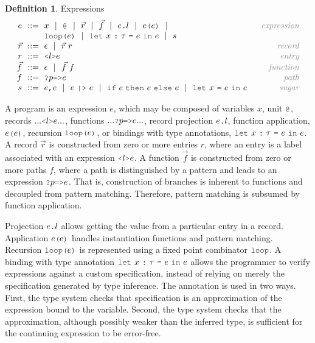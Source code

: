 \documentclass[acmsmall]{acmart}
\theoremstyle{definition}
\newtheorem{definition}{Definition}[section]
\begin{document}
\begin{definition} Expressions
  \label{def:expressions}
  \[\begin{array}[t]{r@{}l@{}r}
    \nonterm{e} 
    & 
    \is 
    \begin{array}[t]{@{}l}
      x \sep 
      \J{@} \sep
      \vec{r} \sep
      \vec{f} \sep 
      e\J{.}l \sep
      e\J{(}e\J{)} \sep
      \\
      \J{loop(}e\J{)} \sep
      \J{let}\ x\ \J{:}\ \tau\ \J{=}\ e\ \J{in}\ e \sep
      s
    \end{array}
    & \com{expression}
    \\
    \nonterm{\vec{r}} & \is \epsilon \sep \vec{r}\ r 
    & \com{record}
    \\
    \nonterm{r} & \is \J{<}l\J{>}e
    & \com{entry}
    \\
    \nonterm{\vec{f}} & \is \epsilon \sep \vec{f}\ f
    & \com{function}
    \\
    \nonterm{f} & \is \J{?}p\J{=>}e
    & \com{path}
    \\
    \nonterm{s} 
    & 
    \is 
    \begin{array}[t]{@{}l}
      e \J{,} e \sep
      e\ \J{|>}\ e \sep
      \J{if}\ e\ \J{then}\ e\ \J{else}\ e \sep
      \J{let}\ x\ \J{=}\ e\ \J{in}\ e
    \end{array}
    & \com{sugar}
  \end{array}\]
\end{definition}

\noindent
A program is an expression $e$, which may be composed of variables $x$, unit $\J{@}$,
records $... \J{<}l\J{>} e ...$, functions $...\J{?}p \J{=>} e ...$, record
projection $e\J{.}l$, function application, $e\J{(}e\J{)}$, recursion $\J{loop(}e\J{)}$,
or bindings with type annotations, $\J{let}\ x\ \J{:}\ \tau\ \J{=}\ e\ \J{in}\ e$.
A record $\vec{r}$ is constructed from zero or more entries $r$, where an entry
is a label associated with an expression $\J{<}l\J{>}e$.
A function $\vec{f}$ is constructed from zero or more paths $f$, where a path is distinguished by a pattern
and leads to an expression $\J{?}p \J{=>} e$.
That is, construction of branches is inherent to functions and decoupled from pattern matching.
Therefore, pattern matching is subsumed by function application.

Projection $e\J{.}l$ allows getting the value from a particular entry in a record. 
Application $e\J{(}e\J{)}$ handles instantiation functions and pattern matching. 
Recursion $\J{loop(}e\J{)}$ is represented using a fixed point combinator $\J{loop}$.
A binding with type annotation $\J{let}\ x\ \J{:}\ \tau\ \J{=}\ e\ \J{in}\ e$ allows the programmer 
to verify expressions against a custom specification, instead of relying on merely 
the specification generated by type inference.
The annotation is used in two ways. First, the type system checks that specification is an approximation
of the expression bound to the variable. Second, the type system checks that the approximation,
although possibly weaker than the inferred type, is sufficient for the continuing expression to be error-free. 
\end{document}
